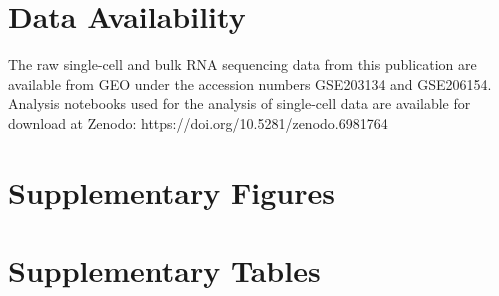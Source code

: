 \section{Data Availability}
The raw single-cell and bulk RNA sequencing data from this publication are available from GEO under the accession numbers GSE203134 and GSE206154. Analysis notebooks used for the analysis of single-cell data are available for download at Zenodo: https://doi.org/10.5281/zenodo.6981764


\section{Supplementary Figures}

\section{Supplementary Tables}

